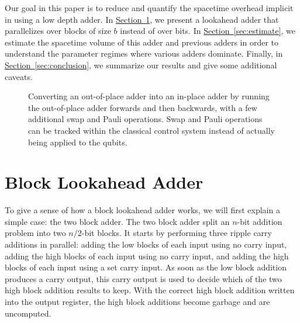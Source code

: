\documentclass[onecolumn,unpublished]{quantumarticle}
\theoremstyle{definition}
\theoremstyle{definition}
\theoremstyle{definition}
\renewcommand{\sec}[1]{\hyperref[sec:#1]{Section~\ref*{sec:#1}}}
\begin{document}
Our goal in this paper is to reduce and quantify the spacetime overhead implicit in using a low depth adder.
In \sec{block}, we present a lookahead adder that parallelizes over blocks of size $b$ instead of over bits.
In \sec{estimate}, we estimate the spacetime volume of this adder and previous adders in order to understand the parameter regimes where various adders dominate.
Finally, in \sec{conclusion}, we summarize our results and give some additional caveats.


\begin{figure}
\centering
{}
    \caption{
        Converting an out-of-place adder into an in-place adder by running the out-of-place adder forwards and then backwards, with a few additional swap and Pauli operations.
        Swap and Pauli operations can be tracked within the classical control system instead of actually being applied to the qubits.
    }
    \label{fig:oop2ip}
\end{figure}

\section{Block Lookahead Adder}
\label{sec:block}

To give a sense of how a block lookahead adder works, we will first explain a simple case: the two block adder.
The two block adder split an $n$-bit addition problem into two $n/2$-bit blocks.
It starts by performing three ripple carry additions in parallel: adding the low blocks of each input using no carry input, adding the high blocks of each input using no carry input, and adding the high blocks of each input using a set carry input.
As soon as the low block addition produces a carry output, this carry output is used to decide which of the two high block addition results to keep.
With the correct high block addition written into the output register, the high block additions become garbage and are uncomputed.
\end{document}
